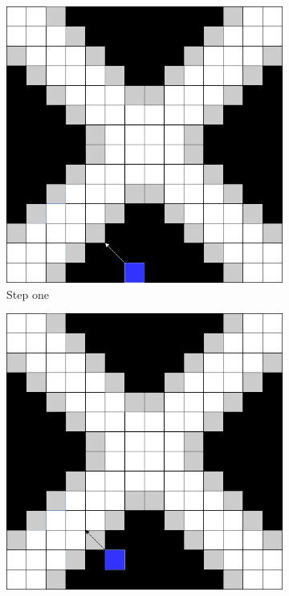 \documentclass[../Head/Main.tex]{subfiles}
\begin{document}
\begin{figure}[H]
    \centering
    \begin{subfigure}{.24\textwidth}
        \centering
        \includegraphics[width=\textwidth]{../Figures/screening_algorithm/fence_search_step1.png}
        \caption{Step one}
        \label{fig:fence_search_step1}
    \end{subfigure}
    \hfill
    \begin{subfigure}{.24\textwidth}
        \centering
        \includegraphics[width=\textwidth]{../Figures/screening_algorithm/fence_search_step2.png}

\end{subfigure}
\end{figure}
\end{document}
